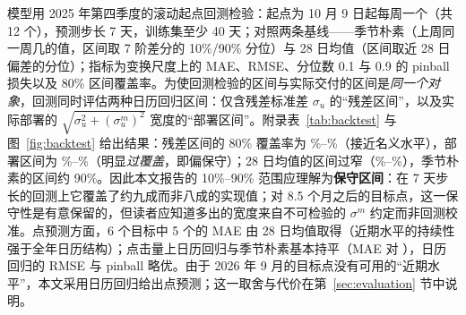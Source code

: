 模型用 2025 年第四季度的滚动起点回测检验\cite{hyndman2021}：起点为 10 月 9 日起每周一个（共 12 个），预测步长 7 天，训练集至少 40 天；对照两条基线——季节朴素（上周同一周几的值，区间取 7 阶差分的 10\%/90\% 分位）与 28 日均值（区间取近 28 日偏差的分位）；指标为变换尺度上的 MAE、RMSE、分位数 0.1 与 0.9 的 pinball 损失\cite{koenker1978,gneiting2007}以及 80\% 区间覆盖率。为使回测检验的区间与实际交付的区间是\emph{同一个对象}，回测同时评估两种日历回归区间：仅含残差标准差 $\sigma_u$ 的“残差区间”，以及实际部署的 $\sqrt{\sigma_u^2+(\sigma^{m}_u)^2}$ 宽度的“部署区间”。附录表~\ref{tab:backtest} 与图~\ref{fig:backtest} 给出结果：残差区间的 80\% 覆盖率为 \valBacktestCalendarCoverageMin\%--\valBacktestCalendarCoverageMax\%（接近名义水平），部署区间为 \valBacktestWideCoverageMin\%--\valBacktestWideCoverageMax\%（明显\emph{过覆盖}，即偏保守）；28 日均值的区间过窄（\valBacktestMeanCoverageMin\%--\valBacktestMeanCoverageMax\%），季节朴素的区间约 90\%。因此本文报告的 10\%--90\% 范围应理解为\textbf{保守区间}：在 7 天步长的回测上它覆盖了约九成而非八成的实现值；对 8.5 个月之后的目标点，这一保守性是有意保留的，但读者应知道多出的宽度来自不可检验的 $\sigma^{m}$ 约定而非回测校准。点预测方面，6 个目标中 5 个的 MAE 由 28 日均值取得（近期水平的持续性强于全年日历结构）；点击量上日历回归与季节朴素基本持平（MAE \valBacktestCalendarMaeClicks{} 对 \valBacktestNaiveMaeClicks），日历回归的 RMSE 与 pinball 略优。由于 2026 年 9 月的目标点没有可用的“近期水平”，本文采用日历回归给出点预测；这一取舍与代价在第~\ref{sec:evaluation} 节中说明。


